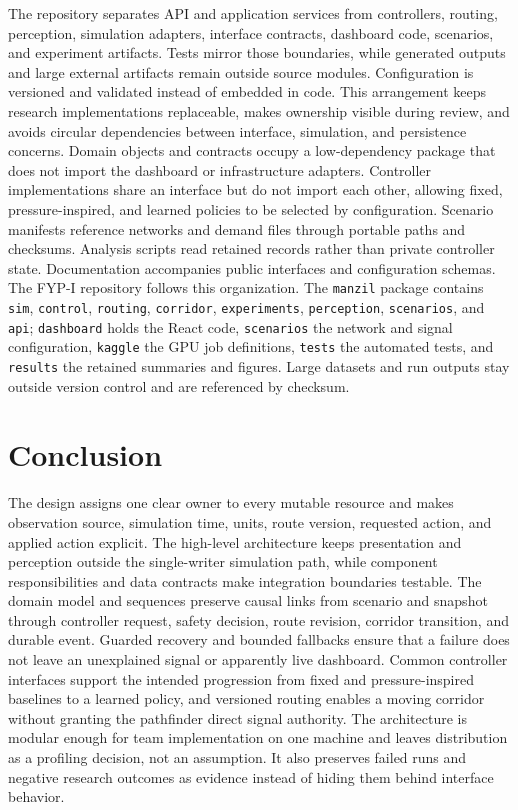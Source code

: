The repository separates API and application services from controllers, routing, perception, simulation adapters, interface contracts, dashboard code, scenarios, and experiment artifacts. Tests mirror those boundaries, while generated outputs and large external artifacts remain outside source modules. Configuration is versioned and validated instead of embedded in code. This arrangement keeps research implementations replaceable, makes ownership visible during review, and avoids circular dependencies between interface, simulation, and persistence concerns. Domain objects and contracts occupy a low-dependency package that does not import the dashboard or infrastructure adapters. Controller implementations share an interface but do not import each other, allowing fixed, pressure-inspired, and learned policies to be selected by configuration. Scenario manifests reference networks and demand files through portable paths and checksums. Analysis scripts read retained records rather than private controller state. Documentation accompanies public interfaces and configuration schemas. The FYP-I repository follows this organization. The \texttt{manzil} package contains \texttt{sim}, \texttt{control}, \texttt{routing}, \texttt{corridor}, \texttt{experiments}, \texttt{perception}, \texttt{scenarios}, and \texttt{api}; \texttt{dashboard} holds the React code, \texttt{scenarios} the network and signal configuration, \texttt{kaggle} the GPU job definitions, \texttt{tests} the automated tests, and \texttt{results} the retained summaries and figures. Large datasets and run outputs stay outside version control and are referenced by checksum.

\section{Conclusion}

The design assigns one clear owner to every mutable resource and makes observation source, simulation time, units, route version, requested action, and applied action explicit. The high-level architecture keeps presentation and perception outside the single-writer simulation path, while component responsibilities and data contracts make integration boundaries testable. The domain model and sequences preserve causal links from scenario and snapshot through controller request, safety decision, route revision, corridor transition, and durable event. Guarded recovery and bounded fallbacks ensure that a failure does not leave an unexplained signal or apparently live dashboard. Common controller interfaces support the intended progression from fixed and pressure-inspired baselines to a learned policy, and versioned routing enables a moving corridor without granting the pathfinder direct signal authority. The architecture is modular enough for team implementation on one machine and leaves distribution as a profiling decision, not an assumption. It also preserves failed runs and negative research outcomes as evidence instead of hiding them behind interface behavior.
